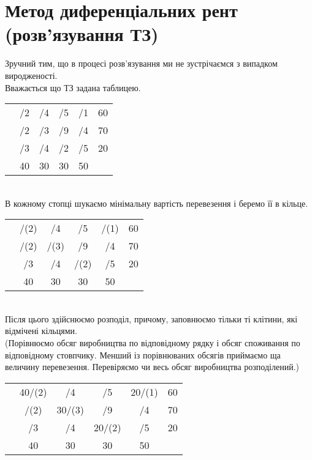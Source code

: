 \documentclass[12pt]{book}
\begin{document}
\section{Метод диференціальних рент (розв’язування ТЗ)}
Зручний тим, що в процесі розв’язування ми не зустрічаємся з випадком виродженості.\\
Вважається що ТЗ задана таблицею.\\
\begin{tabular}{ | c | c | c | c | c | c | }
\hline
	&		&		&		&		&\\
\hline
	&	/2	&	/4	&	/5	&	/1	&	60\\
\hline
	&	/2	&	/3	&	/9	&	/4	&	70\\
\hline
	&	/3	&	/4	&	/2	&	/5	&	20\\
\hline
	&	40	&	30	&	30	&	50	&\\
\hline
\end{tabular}\\
В кожному стопці шукаємо мінімальну вартість перевезення і беремо її в кільце.\\
\begin{tabular}{ | c | c | c | c | c | c | }
\hline
	&		&		&		&		&\\
\hline
	&	/(2)	&	/4	&	/5	&	/(1)	&	60\\
\hline
	&	/(2)	&	/(3)	&	/9	&	/4	&	70\\
\hline
	&	/3	&	/4	&	/(2)	&	/5	&	20\\
\hline
	&	40	&	30	&	30	&	50	&\\
\hline
\end{tabular}\\
Після цього здійснюємо розподіл, причому, заповнюємо тільки ті клітини, які відмічені кільцями.\\
(Порівнюємо обсяг виробництва по відповідному рядку і обсяг споживання по відповідному стовпчику. Менший із порівнюваних обсягів приймаємо ща величину перевезення. Перевіряємо чи весь обсяг виробництва розподілений.)\\
\begin{tabular}{ | c | c | c | c | c | c | }
\hline
	&		&		&		&		&\\
\hline
	&	40/(2)	&	/4	&	/5	&	20/(1)	&	60\\
\hline
	&	/(2)	&	30/(3)	&	/9	&	/4	&	70\\
\hline
	&	/3	&	/4	&	20/(2)	&	/5	&	20\\
\hline
	&	40	&	30	&	30	&	50	&\\
\hline
\end{tabular}\\
\end{document}
